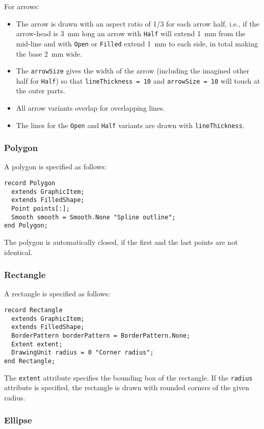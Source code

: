 For arrows:
\begin{itemize}
\item
  The arrow is drawn with an aspect ratio of 1/3 for each arrow half, i.e., if the arrow-head is 3~mm long an arrow with \lstinline!Half! will extend 1~mm from the mid-line and with \lstinline!Open! or \lstinline!Filled! extend 1~mm to each side, in total making the base 2~mm wide.
\item
  The \lstinline!arrowSize! gives the width of the arrow (including the imagined other half for \lstinline!Half!) so that \lstinline!lineThickness = 10! and \lstinline!arrowSize = 10! will touch at the outer parts.
\item
  All arrow variants overlap for overlapping lines.
\item
  The lines for the \lstinline!Open! and \lstinline!Half! variants are drawn with \lstinline!lineThickness!.
\end{itemize}

\subsubsection{Polygon}\label{polygon}

A polygon is specified as follows:
\begin{lstlisting}[language=modelica]
record Polygon
  extends GraphicItem;
  extends FilledShape;
  Point points[:];
  Smooth smooth = Smooth.None "Spline outline";
end Polygon;
\end{lstlisting}%
The polygon is automatically closed, if the first and the last points are not identical.

\subsubsection{Rectangle}\label{rectangle}

A rectangle is specified as follows:
\begin{lstlisting}[language=modelica]
record Rectangle
  extends GraphicItem;
  extends FilledShape;
  BorderPattern borderPattern = BorderPattern.None;
  Extent extent;
  DrawingUnit radius = 0 "Corner radius";
end Rectangle;
\end{lstlisting}%
The \lstinline!extent! attribute specifies the bounding box of the rectangle.
If the \lstinline!radius! attribute is specified, the rectangle is drawn with rounded corners of the given radius.

\subsubsection{Ellipse}\label{ellipse}

